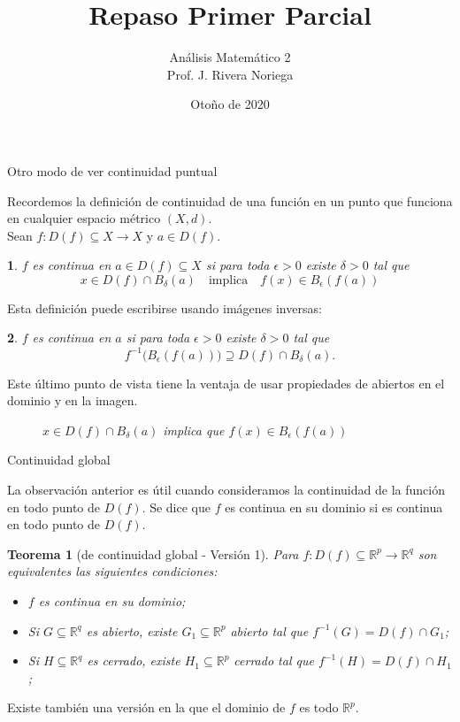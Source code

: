 \documentclass[xcolor=dvipsnames,10pt,handout, draft]{beamer}
\author[MAT24111]{An\'alisis Matem\'atico 2\\Prof. J. Rivera Noriega}
\institute{ITAM}
\title{Repaso Primer Parcial}
\date{Otoño de 2020}
\newcommand{\incfig}[1]{%
    \def\svgwidth{3.5in}
    {#1.pdf_tex}
}
\newcommand{\rzp}{\mathbb R^{p}}
\newcommand{\rzq}{\mathbb R^{q}}
\newtheorem*{afirma}{}
\newtheorem*{teo}{Teorema}
\begin{document}
\frame{\titlepage}


\begin{frame}{Otro modo de ver continuidad puntual}

Recordemos la definici\'on de continuidad de una funci\'on en un punto que funciona en cualquier espacio m\'etrico $(X,d)$. \pause\\
Sean $f:D(f)\subseteq X\to X$ y $a\in D(f)$. \pause

\begin{afirma}
$f$ es continua en $a\in D(f)\subseteq X$ si para toda $\epsilon>0$ existe $\delta>0$ tal que 
$$x\in D(f)\cap B_\delta(a)\quad\text{implica}\quad f(x)\in B_\epsilon(f(a))$$
\end{afirma}\pause
Esta definici\'on puede escribirse usando im\'agenes inversas:\pause
\begin{afirma}
$f$ es continua en $a$ si para toda $\epsilon>0$ existe $\delta>0$ tal que 
$$f^{-1}\big(B_\epsilon(f(a))\big)\supseteq D(f)\cap B_\delta(a).$$
\end{afirma}\pause
Este \'ultimo punto de vista tiene la ventaja de usar propiedades de abiertos en el dominio y en la imagen.

\end{frame}


\begin{frame}

\begin{figure}[ht]
    \centering
    \caption{\em $x\in D(f)\cap B_\delta(a)$ implica que $f(x)\in B_\epsilon(f(a))$}
\end{figure}

\end{frame}


\begin{frame}{Continuidad global}

La observaci\'on anterior es \'util cuando consideramos la continuidad de la funci\'on {\color{red!77!black} en todo punto} de $D(f)$.
\vskip4pt\pause
Se dice que $f$ es {\color{red!77!black} continua en su dominio} si es continua en todo punto de $D(f)$.\pause

\begin{teo}[de continuidad global - Versi\'on 1]
Para $f:D(f)\subseteq\rzp\to\rzq$ son equivalentes las siguientes condiciones:
\begin{itemize}
\item[(a)] $f$ es continua en su dominio;\pause
\item[(b)] Si $G\subseteq\rzq$ es abierto, existe $G_1\subseteq\rzp$ abierto tal que $\displaystyle f^{-1}(G)=D(f)\cap G_1$;\pause
\item[(c)] Si $H\subseteq\rzq$ es cerrado, existe $H_1\subseteq\rzp$ cerrado tal que $\displaystyle f^{-1}(H)=D(f)\cap H_1$;\pause
\end{itemize}
\end{teo}
Existe tambi\'en una versi\'on en la que el dominio de $f$ es todo $\rzp$.

\end{frame}
\end{document}

